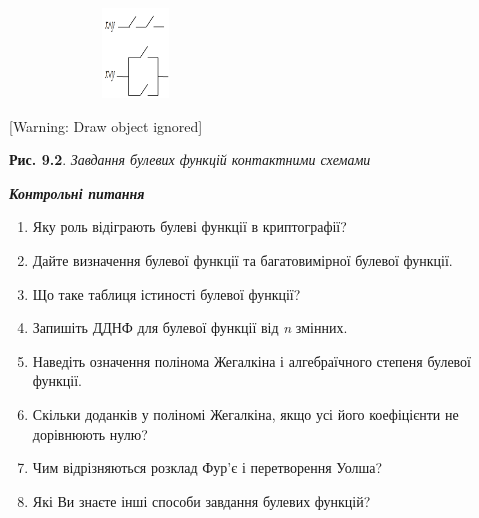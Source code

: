 \documentclass[a4paper]{article}
\newcommand\liststyleWWviiiNumlvii{%
\renewcommand\theenumi{\arabic{enumi}}
\renewcommand\theenumii{\alph{enumii}}
\renewcommand\theenumiii{\roman{enumiii}}
\renewcommand\theenumiv{\arabic{enumiv}}
\renewcommand\labelenumi{\theenumi.}
\renewcommand\labelenumii{\theenumii.}
\renewcommand\labelenumiii{\theenumiii.}
\renewcommand\labelenumiv{\theenumiv.}
}
\newcounter{}
\begin{document}
\bigskip



\begin{figure}
\centering
\begin{minipage}{2.4217in}
{\centering 
\includegraphics[width=1.802in,height=0.9374in]{crypt-img/crypt-img168.png}
\par}
\end{minipage}
\end{figure}

\bigskip


\bigskip


\bigskip


\bigskip

[Warning: Draw object ignored]

{\centering
\textbf{Рис. 9.2}. \textit{Завдання булевих функцій контактними схемами}
\par}


\bigskip


\bigskip

{\centering\bfseries\itshape
Контрольні питання 
\par}


\bigskip


\bigskip

\liststyleWWviiiNumlvii
\begin{enumerate}
\item Яку роль\textbf{ }відіграють булеві функції в криптографії?
\item Дайте визначення булевої функції та багатовимірної булевої функції.
\item Що таке таблиця істиності булевої функції?
\item Запишіть ДДНФ для булевої функції від \textit{n} змінних.
\item Наведіть означення полінома Жегалкіна і алгебраїчного
с\textcolor[rgb]{0.0,0.5019608,0.0}{тепеня}  булевої функції.
\item Скільки доданків у поліномі Жегалкіна, якщо усі його коефіцієнти не
дорівнюють нулю?
\item Чим відрізняються розклад Фур’є і перетворення Уолша?
\item Які Ви знаєте інші способи завдання булевих функцій?
\end{enumerate}
\end{document}
